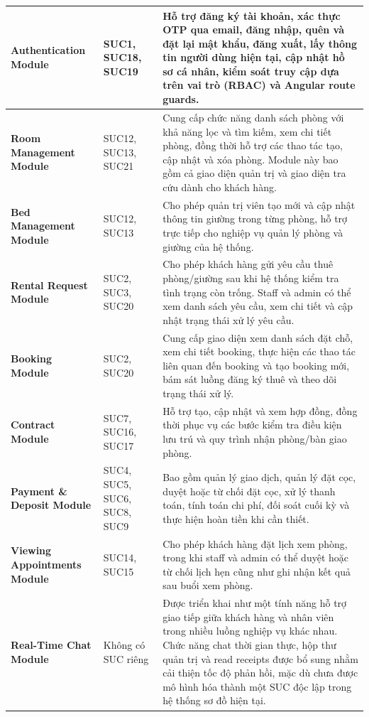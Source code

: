 \begin{longtable}{|p{4.0cm}|p{2.9cm}|p{8.1cm}|}
\textbf{Authentication Module} & SUC1, SUC18, SUC19 & Hỗ trợ đăng ký tài khoản, xác thực OTP qua email, đăng nhập, quên và đặt lại mật khẩu, đăng xuất, lấy thông tin người dùng hiện tại, cập nhật hồ sơ cá nhân, kiểm soát truy cập dựa trên vai trò (RBAC) và Angular route guards. \\
\hline
\textbf{Room Management Module} & SUC12, SUC13, SUC21 & Cung cấp chức năng danh sách phòng với khả năng lọc và tìm kiếm, xem chi tiết phòng, đồng thời hỗ trợ các thao tác tạo, cập nhật và xóa phòng. Module này bao gồm cả giao diện quản trị và giao diện tra cứu dành cho khách hàng. \\
\hline
\textbf{Bed Management Module} & SUC12, SUC13 & Cho phép quản trị viên tạo mới và cập nhật thông tin giường trong từng phòng, hỗ trợ trực tiếp cho nghiệp vụ quản lý phòng và giường của hệ thống. \\
\hline
\textbf{Rental Request Module} & SUC2, SUC3, SUC20 & Cho phép khách hàng gửi yêu cầu thuê phòng/giường sau khi hệ thống kiểm tra tình trạng còn trống. Staff và admin có thể xem danh sách yêu cầu, xem chi tiết và cập nhật trạng thái xử lý yêu cầu. \\
\hline
\textbf{Booking Module} & SUC2, SUC20 & Cung cấp giao diện xem danh sách đặt chỗ, xem chi tiết booking, thực hiện các thao tác liên quan đến booking và tạo booking mới, bám sát luồng đăng ký thuê và theo dõi trạng thái xử lý. \\
\hline
\textbf{Contract Module} & SUC7, SUC16, SUC17 & Hỗ trợ tạo, cập nhật và xem hợp đồng, đồng thời phục vụ các bước kiểm tra điều kiện lưu trú và quy trình nhận phòng/bàn giao phòng. \\
\hline
\textbf{Payment \& Deposit Module} & SUC4, SUC5, SUC6, SUC8, SUC9 & Bao gồm quản lý giao dịch, quản lý đặt cọc, duyệt hoặc từ chối đặt cọc, xử lý thanh toán, tính toán chi phí, đối soát cuối kỳ và thực hiện hoàn tiền khi cần thiết. \\
\hline
\textbf{Viewing Appointments Module} & SUC14, SUC15 & Cho phép khách hàng đặt lịch xem phòng, trong khi staff và admin có thể duyệt hoặc từ chối lịch hẹn cũng như ghi nhận kết quả sau buổi xem phòng. \\
\hline
\textbf{Real-Time Chat Module} & Không có SUC riêng & Được triển khai như một tính năng hỗ trợ giao tiếp giữa khách hàng và nhân viên trong nhiều luồng nghiệp vụ khác nhau. Chức năng chat thời gian thực, hộp thư quản trị và read receipts được bổ sung nhằm cải thiện tốc độ phản hồi, mặc dù chưa được mô hình hóa thành một SUC độc lập trong hệ thống sơ đồ hiện tại. \\

\end{longtable}
